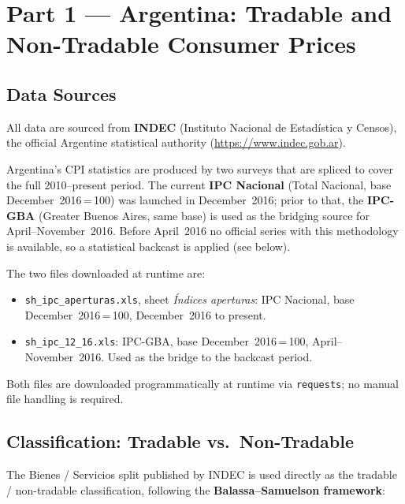 \documentclass[11pt, a4paper]{article}
\begin{document}
\vspace{12pt}

\section{Part 1 — Argentina: Tradable and Non-Tradable Consumer Prices}

\subsection{Data Sources}

All data are sourced from \textbf{INDEC} (Instituto Nacional de Estadística y
Censos), the official Argentine statistical authority
(\url{https://www.indec.gob.ar}).

Argentina's CPI statistics are produced by two surveys that are spliced
to cover the full 2010--present period. The current \textbf{IPC Nacional}
(Total Nacional, base December~2016\,=\,100) was launched in December~2016;
prior to that, the \textbf{IPC-GBA} (Greater Buenos Aires, same base) is
used as the bridging source for April–November~2016. Before April~2016 no
official series with this methodology is available, so a statistical
backcast is applied (see below).

The two files downloaded at runtime are:

\begin{itemize}[leftmargin=1.5em, itemsep=2pt]
    \item \texttt{sh\_ipc\_aperturas.xls}, sheet \emph{Índices aperturas}:
          IPC Nacional, base December~2016\,=\,100, December~2016 to present.

    \item \texttt{sh\_ipc\_12\_16.xls}: IPC-GBA, base December~2016\,=\,100,
          April–November~2016. Used as the bridge to the backcast period.
\end{itemize}

Both files are downloaded programmatically at runtime via \texttt{requests};
no manual file handling is required.

\subsection{Classification: Tradable vs.\ Non-Tradable}

The Bienes / Servicios split published by INDEC is used directly as the
tradable / non-tradable classification, following the
\textbf{Balassa--Samuelson framework}:
\end{document}
